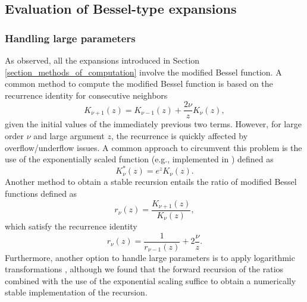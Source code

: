 \documentclass[10pt,a4paper,oneside]{article}
\numberwithin{equation}{section}
\begin{document}
\subsection{Evaluation of Bessel-type expansions}
\label{subsection_evaluation_bessel_expansions}

\subsubsection{Handling large parameters}
As observed, all the expansions introduced in Section \ref{section_methods_of_computation} involve the modified Bessel function. A common method to compute the modified Bessel function is based on the recurrence identity for consecutive neighbors \cite{Abramowitz1972}
\begin{equation}
K_{\nu + 1}(z) = K_{\nu - 1}(z) + \frac{2\nu}{z} K_{\nu}(z),
\end{equation}
given the initial values of the immediately previous two terms. However, for large order $\nu$ and large argument $z$, the recurrence is quickly affected by overflow/underflow issues. A common approach to circumvent this problem is the use of the exponentially scaled function (e.g., implemented in \cite{Cody1993}) defined as
\begin{equation}
K^*_{\nu}(z) = e^z K_{\nu}(z).
\end{equation}
Another method to obtain a stable recursion entails the ratio of modified Bessel functions defined as
\begin{equation}
r_{\nu}(z) = \frac{K_{\nu+1}(z)}{K_{\nu}(z)},
\end{equation} 
which satisfy the recurrence identity \cite{Xue2018}
\begin{equation}
r_{\nu}(z) = \frac{1}{r_{\nu - 1}(z)} + 2\frac{\nu}{z}.
\end{equation}
Furthermore, another option to handle large parameters is to apply logarithmic transformations \cite{Xue2018}, although we found that the forward recursion of the ratios combined with the use of the exponential scaling suffice to obtain a numerically stable implementation of the recursion.
\end{document}
